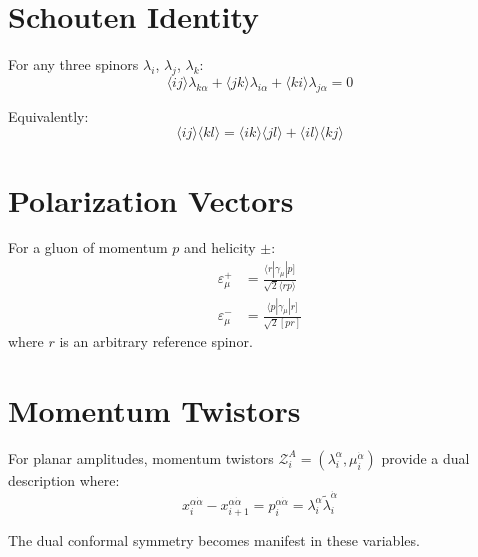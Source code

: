 \section{Schouten Identity}

For any three spinors $\lambda_i$, $\lambda_j$, $\lambda_k$:
\begin{equation}
\langle i j \rangle \lambda_{k\alpha} + \langle j k \rangle \lambda_{i\alpha} + \langle k i \rangle \lambda_{j\alpha} = 0
\end{equation}

Equivalently:
\begin{equation}
\langle i j \rangle \langle k l \rangle = \langle i k \rangle \langle j l \rangle + \langle i l \rangle \langle k j \rangle
\end{equation}

\section{Polarization Vectors}
\label{sec:spinor-helicity-polarization}

For a gluon of momentum $p$ and helicity $\pm$:
\begin{align}
\varepsilon^+_\mu &= \frac{\langle r | \gamma_\mu | p ]}{\sqrt{2} \langle r p \rangle} \\
\varepsilon^-_\mu &= \frac{\langle p | \gamma_\mu | r ]}{\sqrt{2} [p r]}
\end{align}
where $r$ is an arbitrary reference spinor.

\section{Momentum Twistors}

For planar amplitudes, momentum twistors $\mathcal{Z}_i^A = (\lambda_i^\alpha, \mu_i^{\dot{\alpha}})$ provide a dual description where:
\begin{equation}
x_i^{\alpha\dot{\alpha}} - x_{i+1}^{\alpha\dot{\alpha}} = p_i^{\alpha\dot{\alpha}} = \lambda_i^\alpha \tilde{\lambda}_i^{\dot{\alpha}}
\end{equation}

The dual conformal symmetry becomes manifest in these variables.

